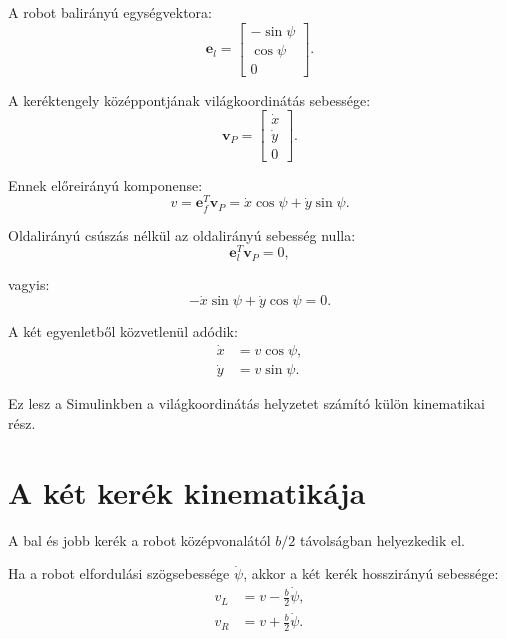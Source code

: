 \documentclass[12pt,a4paper]{article}
\begin{document}
	A robot balirányú egységvektora:
	\begin{equation}
		\bm e_l=
		\begin{bmatrix}
			-\sin\psi\\
			\cos\psi\\
			0
		\end{bmatrix}.
	\end{equation}
	
	A keréktengely középpontjának világkoordinátás sebessége:
	\begin{equation}
		\bm v_P=
		\begin{bmatrix}
			\dot x\\
			\dot y\\
			0
		\end{bmatrix}.
	\end{equation}
	
	Ennek előreirányú komponense:
	\begin{equation}
		v=\bm e_f^T\bm v_P
		=\dot x\cos\psi+\dot y\sin\psi.
	\end{equation}
	
	Oldalirányú csúszás nélkül az oldalirányú sebesség nulla:
	\begin{equation}
		\bm e_l^T\bm v_P=0,
	\end{equation}
	
	vagyis:
	\begin{equation}
		-\dot x\sin\psi+\dot y\cos\psi=0.
	\end{equation}
	
	A két egyenletből közvetlenül adódik:
	\begin{align}
		\dot x &= v\cos\psi,\\
		\dot y &= v\sin\psi.
	\end{align}
	
	Ez lesz a Simulinkben a világkoordinátás helyzetet számító külön kinematikai rész.
	
	\section{A két kerék kinematikája}
	
	A bal és jobb kerék a robot középvonalától $b/2$ távolságban helyezkedik el.
	
	Ha a robot elfordulási szögsebessége $\dot\psi$, akkor a két kerék hosszirányú sebessége:
	\begin{align}
		v_L &= v-\frac{b}{2}\dot\psi,\\
		v_R &= v+\frac{b}{2}\dot\psi.
	\end{align}
	
\end{document}
